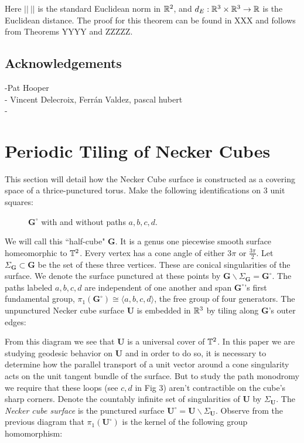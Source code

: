 \documentclass[]{article}
\def\bU{\mathbf{U}} \def\btU{\tilde{\bU}} \def\bUs{\bU^\circ}
\def\bG{\mathbf{G}} \def\bGs{\mathbf{G}^\circ}
\def\<{\langle} \def\>{\rangle}
\begin{document}
Here $||~||$ is the standard Euclidean norm in $\mathbb{R}^2$, and $d_E:\mathbb{R}^3\times\mathbb{R}^3\rightarrow\mathbb{R}$ is the Euclidean distance. The proof for this theorem can be found in XXX and follows from Theorems YYYY and ZZZZZ.

\subsection{Acknowledgements}
-Pat Hooper\\
- Vincent Delecroix, Ferrán Valdez, pascal hubert\\
- \\

\newpage

\section{Periodic Tiling of Necker Cubes}
This section will detail how the Necker Cube surface is constructed as a covering space of a thrice-punctured torus. Make the following identifications on 3 unit squares:
\begin{figure}[H]
\centering

\caption{$\bGs$ with and without paths $a,b,c,d$.}
\end{figure}

We will call this ``half-cube" $\bG$. It is a genus one piecewise smooth surface homeomorphic to $\mathbb{T}^2$. Every vertex has a cone angle of either $3\pi$ or $\frac{3\pi}{2}$. Let $\Sigma_{\bG}\subset\bG$ be the set of these three vertices. These are conical singularities of the surface. We denote the surface punctured at these points by $\bG\backslash\Sigma_{\bG} = \bGs$. The paths labeled $a,b,c,d$ are independent of one another and span $\bGs$'s first fundamental group, $\pi_1(\bGs)\cong \<a,b,c,d \>$, the free group of four generators. The unpunctured Necker cube surface $\bU$ is embedded in $\mathbb{R}^3$ by tiling along $\bG$'s outer edges:

\begin{figure}[H]
\centering

\end{figure}
From this diagram we see that $\bU$ is a universal cover of $\mathbb{T}^2$. In this paper we are studying geodesic behavior on $\bU$ and in order to do so, it is necessary to determine how the parallel transport of a unit vector around a cone singularity acts on the unit tangent bundle of the surface. But to study the path monodromy we require that these loops (see $c,d$ in Fig 3) aren't contractible on the cube's sharp corners. Denote the countably infinite set of singularities of $\bU$ by $\Sigma_{\bU}$. The \emph{Necker cube surface} is the punctured surface $\bUs=\bU\backslash\Sigma_{\bU}$. Observe from the previous diagram that $\pi_1(\bUs)$ is the kernel of the following group homomorphism:
\end{document}
